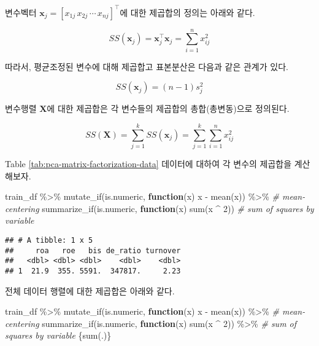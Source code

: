 \documentclass[
]{book}
\newenvironment{Shaded}{\begin{snugshade}}{\end{snugshade}}
\newcommand{\CommentTok}[1]{\textcolor[rgb]{0.56,0.35,0.01}{\textit{#1}}}
\newcommand{\ControlFlowTok}[1]{\textcolor[rgb]{0.13,0.29,0.53}{\textbf{#1}}}
\newcommand{\DecValTok}[1]{\textcolor[rgb]{0.00,0.00,0.81}{#1}}
\newcommand{\FunctionTok}[1]{\textcolor[rgb]{0.00,0.00,0.00}{#1}}
\newcommand{\NormalTok}[1]{#1}
\newcommand{\SpecialCharTok}[1]{\textcolor[rgb]{0.00,0.00,0.00}{#1}}
\begin{document}
변수벡터 \(\mathbf{x}_j = [x_{1j} \, x_{2j} \, \cdots \, x_{nj}]^\top\)에 대한 제곱합의 정의는 아래와 같다.

\begin{equation}
SS(\mathbf{x}_j) = \mathbf{x}_j^\top \mathbf{x}_j = \sum_{i = 1}^{n} x_{ij}^2
\end{equation}

따라서, 평균조정된 변수에 대해 제곱합고 표본분산은 다음과 같은 관계가 있다.

\begin{equation*}
SS(\mathbf{x}_j) = (n - 1) s_j^2
\end{equation*}

변수행렬 \(\mathbf{X}\)에 대한 제곱합은 각 변수들의 제곱합의 총합(총변동)으로 정의된다.

\begin{equation}
SS(\mathbf{X}) = \sum_{j = 1}^{k} SS(\mathbf{x}_j) = \sum_{j = 1}^{k} \sum_{i = 1}^{n} x_{ij}^2
\end{equation}

Table \ref{tab:pca-matrix-factorization-data} 데이터에 대하여 각 변수의 제곱합을 계산해보자.

\begin{Shaded}
\begin{Highlighting}[]
\NormalTok{train\_df }\SpecialCharTok{\%\textgreater{}\%}
  \FunctionTok{mutate\_if}\NormalTok{(is.numeric, }\ControlFlowTok{function}\NormalTok{(x) x }\SpecialCharTok{{-}} \FunctionTok{mean}\NormalTok{(x)) }\SpecialCharTok{\%\textgreater{}\%}  \CommentTok{\# mean{-}centering}
  \FunctionTok{summarize\_if}\NormalTok{(is.numeric, }\ControlFlowTok{function}\NormalTok{(x) }\FunctionTok{sum}\NormalTok{(x }\SpecialCharTok{\^{}} \DecValTok{2}\NormalTok{)) }\CommentTok{\# sum of squares by variable}
\end{Highlighting}
\end{Shaded}

\begin{verbatim}
## # A tibble: 1 x 5
##     roa   roe   bis de_ratio turnover
##   <dbl> <dbl> <dbl>    <dbl>    <dbl>
## 1  21.9  355. 5591.  347817.     2.23
\end{verbatim}

전체 데이터 행렬에 대한 제곱합은 아래와 같다.

\begin{Shaded}
\begin{Highlighting}[]
\NormalTok{train\_df }\SpecialCharTok{\%\textgreater{}\%}
  \FunctionTok{mutate\_if}\NormalTok{(is.numeric, }\ControlFlowTok{function}\NormalTok{(x) x }\SpecialCharTok{{-}} \FunctionTok{mean}\NormalTok{(x)) }\SpecialCharTok{\%\textgreater{}\%}  \CommentTok{\# mean{-}centering}
  \FunctionTok{summarize\_if}\NormalTok{(is.numeric, }\ControlFlowTok{function}\NormalTok{(x) }\FunctionTok{sum}\NormalTok{(x }\SpecialCharTok{\^{}} \DecValTok{2}\NormalTok{)) }\SpecialCharTok{\%\textgreater{}\%} \CommentTok{\# sum of squares by variable}
\NormalTok{  \{}\FunctionTok{sum}\NormalTok{(.)\}}
\end{Highlighting}
\end{Shaded}
\end{document}

